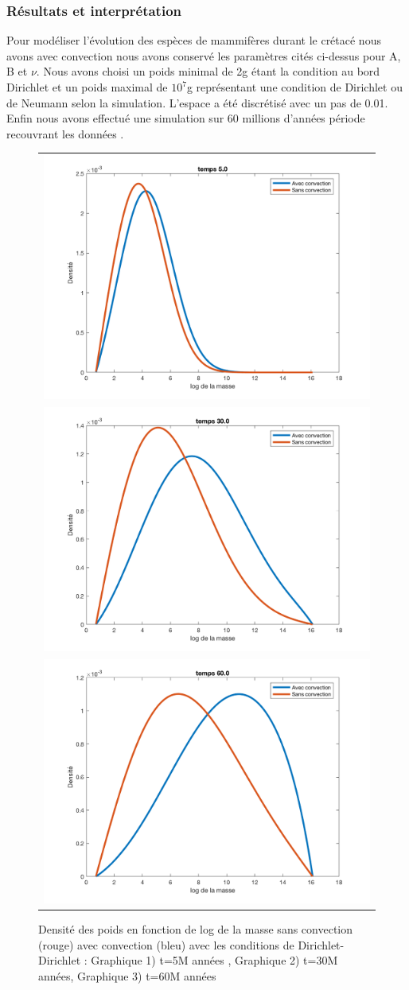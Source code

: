 \documentclass[fleqn,10pt]{SelfArx}
\begin{document}
\subsubsection*{Résultats et interprétation}
Pour modéliser l'évolution des espèces de mammifères durant le crétacé nous avons avec convection nous avons conservé les paramètres cités ci-dessus pour A, B et $\nu$. Nous avons choisi un poids minimal de 2g étant la condition au bord Dirichlet et un poids maximal de $10^7$g représentant une condition de Dirichlet ou de Neumann selon la simulation. L'espace a été discrétisé avec un pas de 0.01. Enfin nous avons effectué une simulation sur 60 millions d'années période recouvrant les données \cite{clauset2008evolution}.

\begin{figure}[htb]
\centering
  \begin{tabular}{c}
    \includegraphics[width=.23\textwidth]{FIG_SC_AC5_0.png} \\
    \includegraphics[width=.23\textwidth]{FIG_SC_AC30_0.png} \\
    \includegraphics[width=.23\textwidth]{FIG_SC_AC60_0.png} \\ 
  \end{tabular}
  \caption{Densité des poids en fonction de log de la masse sans convection (rouge) avec convection (bleu) avec les conditions de Dirichlet-Dirichlet : Graphique 1) t=5M années , Graphique 2) t=30M années,  Graphique 3) t=60M années }
 \end{figure}
\end{document}
